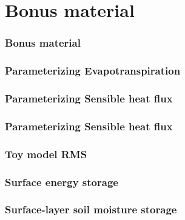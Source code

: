 %
%
\section{Bonus material}
\label{sec:bonus}

\begin{frame}
\frametitle{Bonus material}


\end{frame}

\begin{frame}
\frametitle{Parameterizing Evapotranspiration}


\end{frame}

\begin{frame}
\frametitle{Parameterizing Sensible heat flux}


\end{frame}

\begin{frame}
\frametitle{Parameterizing Sensible heat flux}


\end{frame}

\begin{frame}
\frametitle{Toy model RMS}


\end{frame}

\begin{frame}
\frametitle{Surface energy storage}




\end{frame}

\begin{frame}
\frametitle{Surface-layer soil moisture storage}



\end{frame}

